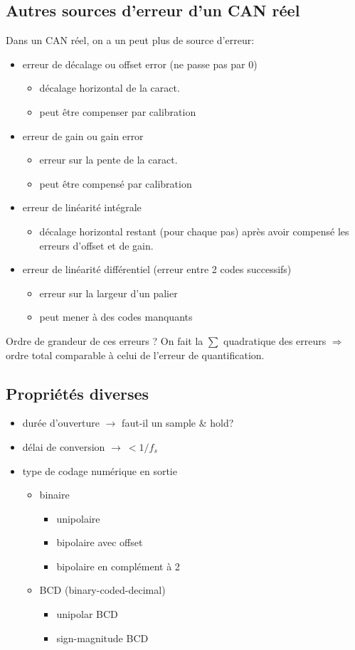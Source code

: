\subsection{Autres sources d'erreur d'un CAN réel}
Dans un CAN réel, on a un peut plus de source d'erreur:
\begin{itemize}
	\item erreur de décalage ou offset error (ne passe pas par 0)
	\begin{itemize}
		\item décalage horizontal de la caract.
		\item peut être compenser par calibration
	\end{itemize}
	\item erreur de gain ou gain error
	\begin{itemize}
		\item erreur sur la pente de la caract.
		\item peut être compensé par calibration
	\end{itemize}
	\item erreur de linéarité intégrale
	\begin{itemize}
		\item décalage horizontal restant (pour chaque pas) après avoir compensé les erreurs d'offset et de gain.
	\end{itemize}
	\item erreur de linéarité différentiel (erreur entre 2 codes successifs)
	\begin{itemize}
		\item erreur sur la largeur d'un palier
		\item peut mener à des codes manquants
	\end{itemize}
\end{itemize}
Ordre de grandeur de ces erreurs ? On fait la \(\sum\) quadratique des erreurs \(\Rightarrow\) ordre total comparable à celui de l'erreur de quantification.
\subsection{Propriétés diverses}
\begin{itemize}
	\item durée d'ouverture \(\rightarrow\) faut-il un sample \& hold?
	\item délai de conversion \(\rightarrow\ < 1/f_s\)
	\item type de codage numérique en sortie
	\begin{itemize}
		\item binaire
		\begin{itemize}
			\item unipolaire
			\item bipolaire avec offset
			\item bipolaire en complément à 2 
		\end{itemize}
		\item BCD (binary-coded-decimal)
		\begin{itemize}
			\item unipolar BCD
			\item sign-magnitude BCD
		\end{itemize}
	\end{itemize}
\end{itemize}
